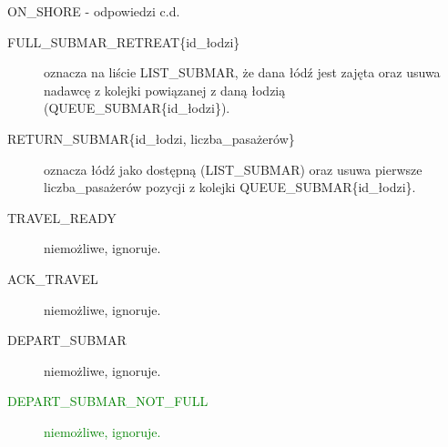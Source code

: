 \documentclass{beamer}
\begin{document}
\begin{frame}{ON\_SHORE - odpowiedzi c.d.}
    \internallinenumbers
    \resetlinenumber[1]
    \begin{description}
        \item [FULL\_SUBMAR\_RETREAT\{id\_łodzi\}] oznacza na liście LIST\_SUBMAR, że dana łódź jest zajęta oraz usuwa nadawcę z kolejki powiązanej z daną łodzią (QUEUE\_SUBMAR\{id\_łodzi\}).
        \item [RETURN\_SUBMAR\{id\_łodzi, liczba\_pasażerów\}] oznacza łódź jako dostępną (LIST\_SUBMAR) oraz usuwa pierwsze liczba\_pasażerów pozycji z kolejki QUEUE\_SUBMAR\{id\_łodzi\}.
        \item [TRAVEL\_READY] niemożliwe, ignoruje.
        \item [ACK\_TRAVEL] niemożliwe, ignoruje.
        \item [DEPART\_SUBMAR] niemożliwe, ignoruje.
        \item [\textcolor{green}{DEPART\_SUBMAR\_NOT\_FULL}] \textcolor{green}{niemożliwe, ignoruje.}
    \end{description}
\end{frame}
\end{document}
